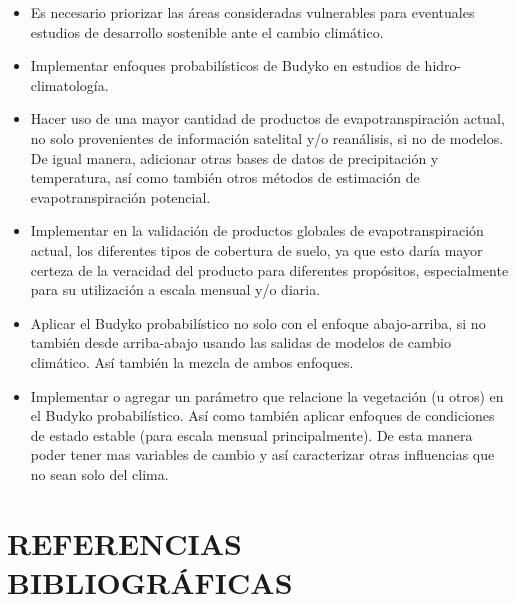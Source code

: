 \documentclass[12pt]{article}
\begin{document}
\begin{itemize}

    \item Es necesario priorizar las áreas consideradas vulnerables para eventuales estudios de desarrollo sostenible ante el cambio climático.

    \item Implementar enfoques probabilísticos de Budyko en estudios de hidro-climatología.
    
    \item Hacer uso de una mayor cantidad de productos de evapotranspiración actual, no solo provenientes de información satelital y/o reanálisis, si no de modelos. De igual manera, adicionar otras bases de datos de precipitación y temperatura, así como también otros métodos de estimación de evapotranspiración potencial.
    
    \item Implementar en la validación de productos globales de evapotranspiración actual, los diferentes tipos de cobertura de suelo, ya que esto daría mayor certeza de la veracidad del producto para diferentes propósitos, especialmente para su utilización a escala mensual y/o diaria.
    
    \item Aplicar el Budyko probabilístico no solo con el enfoque abajo-arriba, si no también desde arriba-abajo usando las salidas de modelos de cambio climático. Así también la mezcla de ambos enfoques.

    \item Implementar o agregar un parámetro que relacione la vegetación (u otros) en el Budyko probabilístico. Así como también aplicar enfoques de condiciones de estado estable (para escala mensual principalmente). De esta manera poder tener mas variables de cambio y así caracterizar otras influencias que no sean solo del clima.
    
\end{itemize}


\clearpage
\vspace*{0.5mm}
\section{REFERENCIAS BIBLIOGRÁFICAS}

\thispagestyle{empty}





\clearpage
\vspace*{0.5mm}
\end{document}

